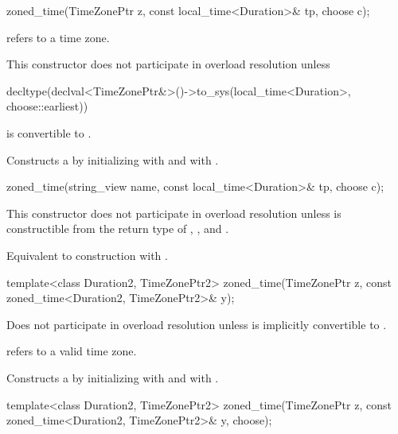 \begin{itemdecl}
zoned_time(TimeZonePtr z, const local_time<Duration>& tp, choose c);
\end{itemdecl}

\begin{itemdescr}
\pnum
\requires {} refers to a time zone.

\pnum
\remarks
This constructor does not participate in overload resolution unless
\begin{codeblock}
decltype(declval<TimeZonePtr&>()->to_sys(local_time<Duration>{}, choose::earliest))
\end{codeblock}
is convertible to .

\pnum
\effects
Constructs a  by
initializing  with  and  with .
\end{itemdescr}

\begin{itemdecl}
zoned_time(string_view name, const local_time<Duration>& tp, choose c);
\end{itemdecl}

\begin{itemdescr}
\pnum
\remarks
This constructor does not participate in overload resolution unless
 is constructible from
the return type of , , and .

\pnum
\effects
Equivalent to construction with .
\end{itemdescr}

\begin{itemdecl}
template<class Duration2, TimeZonePtr2>
  zoned_time(TimeZonePtr z, const zoned_time<Duration2, TimeZonePtr2>& y);
\end{itemdecl}

\begin{itemdescr}
\pnum
\remarks
Does not participate in overload resolution unless
 is implicitly convertible to .

\pnum
\requires {} refers to a valid time zone.

\pnum
\effects Constructs a  by
initializing  with  and  with .
\end{itemdescr}

\begin{itemdecl}
template<class Duration2, TimeZonePtr2>
  zoned_time(TimeZonePtr z, const zoned_time<Duration2, TimeZonePtr2>& y, choose);
\end{itemdecl}

